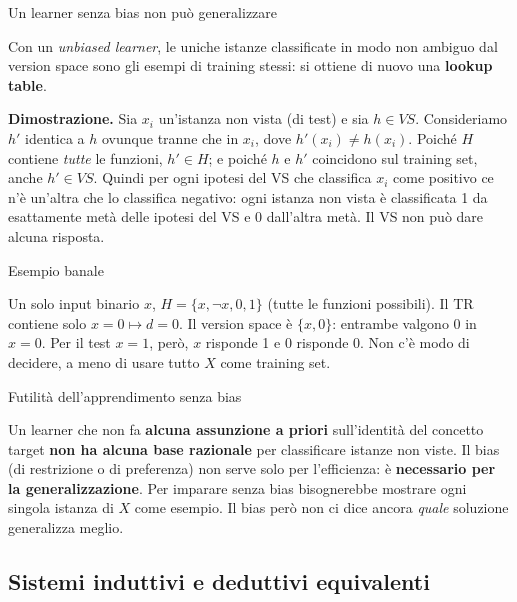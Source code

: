 \begin{boxtheorem}{Un learner senza bias non può generalizzare}

Con un \emph{unbiased learner}, le uniche istanze classificate in modo
non ambiguo dal version space sono gli esempi di training stessi: si
ottiene di nuovo una \textbf{lookup table}.

\textbf{Dimostrazione.} Sia \(x_i\) un'istanza non vista (di test) e sia
\(h \in VS\). Consideriamo \(h'\) identica a \(h\) ovunque tranne che in
\(x_i\), dove \(h'(x_i) \ne h(x_i)\). Poiché \(H\) contiene \emph{tutte}
le funzioni, \(h' \in H\); e poiché \(h\) e \(h'\) coincidono sul
training set, anche \(h' \in VS\). Quindi per ogni ipotesi del VS che
classifica \(x_i\) come positivo ce n'è un'altra che lo classifica
negativo: ogni istanza non vista è classificata 1 da esattamente metà
delle ipotesi del VS e 0 dall'altra metà. Il VS non può dare alcuna
risposta.

\end{boxtheorem}

\begin{boxexample}{Esempio banale}

Un solo input binario \(x\), \(H = \{x, \neg x, 0, 1\}\) (tutte le
funzioni possibili). Il TR contiene solo \(x = 0 \mapsto d = 0\). Il
version space è \(\{x, 0\}\): entrambe valgono 0 in \(x = 0\). Per il
test \(x = 1\), però, \(x\) risponde 1 e \(0\) risponde 0. Non c'è modo
di decidere, a meno di usare tutto \(X\) come training set.

\end{boxexample}

\begin{boxtip}{Futilità dell'apprendimento senza bias}

Un learner che non fa \textbf{alcuna assunzione a priori} sull'identità
del concetto target \textbf{non ha alcuna base razionale} per
classificare istanze non viste. Il bias (di restrizione o di preferenza)
non serve solo per l'efficienza: è \textbf{necessario per la
generalizzazione}. Per imparare senza bias bisognerebbe mostrare ogni
singola istanza di \(X\) come esempio. Il bias però non ci dice ancora
\emph{quale} soluzione generalizza meglio.

\end{boxtip}

\subsection{Sistemi induttivi e deduttivi
equivalenti}\label{sistemi-induttivi-e-deduttivi-equivalenti}

